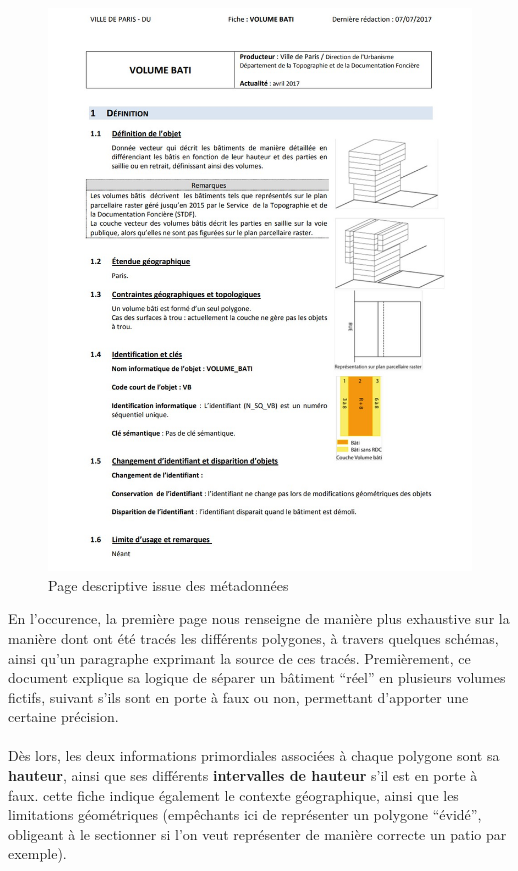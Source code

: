 \documentclass[
  11pt,
  french,
]{article}
\begin{document}
\begin{tcolorbox}
\begin{figure}

{\centering \includegraphics[width=0.9\linewidth]{__imgs/odp_meta1} 

}

\caption[Page descriptive issue des métadonnées  -  https://opendata.paris.fr/]{Page descriptive issue des métadonnées}\label{fig:odp_meta_1}
\end{figure}
\end{tcolorbox}

\hfill\break
En l'occurence, la première page nous renseigne de manière plus
exhaustive sur la manière dont ont été tracés les différents polygones,
à travers quelques schémas, ainsi qu'un paragraphe exprimant la source
de ces tracés. Premièrement, ce document explique sa logique de séparer
un bâtiment ``réel'' en plusieurs volumes fictifs, suivant s'ils sont en
porte à faux ou non, permettant d'apporter une certaine précision.\\
~\\
Dès lors, les deux informations primordiales associées à chaque polygone
sont sa \textbf{hauteur}, ainsi que ses différents \textbf{intervalles
de hauteur} s'il est en porte à faux. cette fiche indique également le
contexte géographique, ainsi que les limitations géométriques
(empêchants ici de représenter un polygone ``évidé'', obligeant à le
sectionner si l'on veut représenter de manière correcte un patio par
exemple).\\
\end{document}
